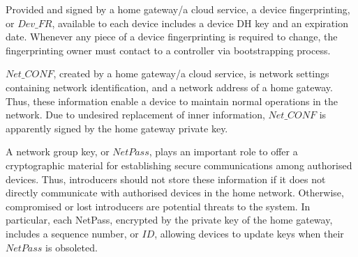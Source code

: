 Provided and signed by a home gateway/a cloud service, a device fingerprinting, or $Dev\_FR$, available to each device includes a device DH key and an expiration date. Whenever any piece of a device fingerprinting is required to change, the fingerprinting owner must contact to a controller via bootstrapping process. 

$Net\_CONF$, created by a home gateway/a cloud service, is network settings containing network identification, and a network address of a home gateway. Thus, these information enable a device to maintain normal operations in the network. Due to undesired replacement of inner information, $Net\_CONF$ is apparently signed by the home gateway private key. 

A network group key, or $NetPass$, plays an important role to offer a cryptographic material for establishing secure communications among authorised devices. Thus, introducers should not store these information if it does not directly communicate with authorised devices in the home network. Otherwise, compromised or lost introducers are potential threats to the system. In particular, each NetPass, encrypted by the private key of the home gateway, includes a sequence number, or $ID$, allowing devices to update keys when their $NetPass$ is obsoleted. 

